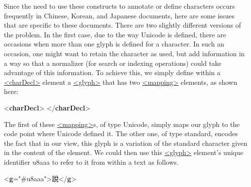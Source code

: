Since the need to use these constructs to annotate or define characters occurs frequently in Chinese, Korean, and Japanese documents, here are some issues that are specific to these documents. There are two slightly different versions of the problem. In the first case, due to the way Unicode is defined, there are occasions when more than one glyph is defined for a character. In such an occasion, one might want to retain the character as used, but add information in a way so that a normalizer (for search or indexing operations) could take advantage of this information. To achieve this, we simply define within a \hyperref[TEI.charDecl]{<charDecl>} element a \hyperref[TEI.glyph]{<glyph>} that has two \hyperref[TEI.mapping]{<mapping>} elements, as shown here: \par\bgroup{}\exampleFont \begin{shaded}\noindent\mbox{}{<\textbf{charDecl}>}\mbox{}\newline 
{}\mbox{}\newline 
\hspace*{1em}\mbox{}\newline 
\hspace*{1em}\mbox{}\newline 
{}\mbox{}\newline 
{</\textbf{charDecl}>}\end{shaded}\egroup\par \noindent  The first of these \hyperref[TEI.mapping]{<mapping>}s, of type Unicode, simply maps our glyph to the code point where Unicode defined it. The other one, of type standard, encodes the fact that in our view, this glyph is a variation of the standard character given in the content of the element. We could then use this \hyperref[TEI.glyph]{<glyph>} element's unique identifier u8aaa to refer to it from within a text as follows. \par\bgroup{}\exampleFont \begin{shaded}\noindent\mbox{}{<\textbf{g}\hspace*{1em}{ref}="{\#u8aaa}">}{\textChinese 說}{</\textbf{g}>}\end{shaded}\egroup\par \par
